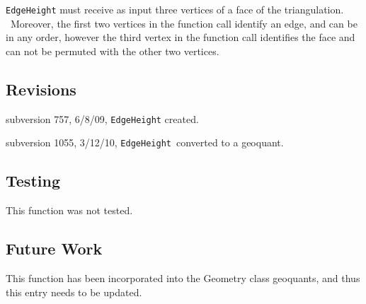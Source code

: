 \texttt{EdgeHeight} must receive as input three vertices of a face of the
triangulation. \ Moreover, the first two vertices in the function call
identify an edge, and can be in any order, however the third vertex in the
function call identifies the face and can not be permuted with the other two
vertices. \ 

\subsection*{Revisions}

subversion 757, 6/8/09, \texttt{EdgeHeight} created.

subversion 1055, 3/12/10, \texttt{EdgeHeight}\ converted to a geoquant.

\subsection*{Testing}

This function was not tested.

\subsection*{Future Work}

This function has been incorporated into the Geometry class geoquants, and
thus this entry needs to be updated. \ 
